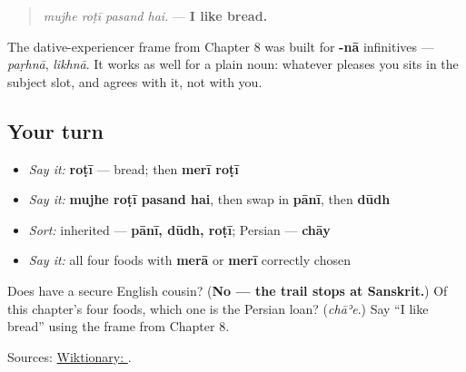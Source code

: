 \begin{grammarlens}[title={Grammar Lens: \emph{mujhe} ... \emph{pasand} \ur{ہے}, one more time}]
\begin{quote}
\emph{mujhe roṭī pasand hai.} — \textbf{I like bread.}
\end{quote}

The dative-experiencer frame from Chapter 8 was built for \textbf{-nā} infinitives — \emph{paṛhnā}, \emph{likhnā}. It works as well for a plain noun: whatever pleases you sits in the subject slot, and \textbf{} agrees with it, not with you.
\end{grammarlens}

\subsection*{Your turn}
\begin{itemize}
\raggedright
  \item \emph{Say it:} \textbf{roṭī} — bread; then \textbf{merī roṭī}
  \item \emph{Say it:} \textbf{mujhe roṭī pasand hai}, then swap in \textbf{pānī}, then \textbf{dūdh}
  \item \emph{Sort:} inherited — \textbf{pānī, dūdh, roṭī}; Persian — \textbf{chāy}
  \item \emph{Say it:} all four foods with \textbf{merā} or \textbf{merī} correctly chosen
\end{itemize}

\begin{tcolorbox}[breakable,colback=teal!4,colframe=teal!35!black,title={Before you move on}]
Does \textbf{} have a secure English cousin? (\textbf{No — the trail stops at Sanskrit.}) Of this chapter's four foods, which one is the Persian loan? (\emph{chāʾe}.) Say \textquotedblleft{}I like bread\textquotedblright{} using the frame from Chapter 8.

Sources: \href{https://en.wiktionary.org/wiki/\%D8\%B1\%D9\%88\%D9\%B9\%DB\%8C}{Wiktionary: }.
\end{tcolorbox}
